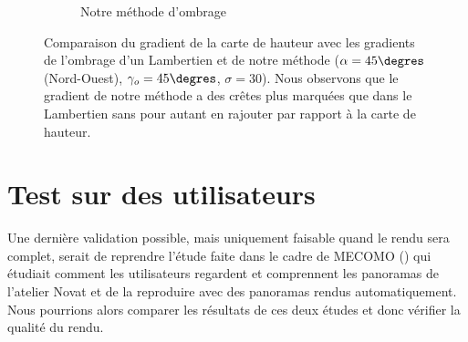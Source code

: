 \begin{figure}[h!]
\begin{subfigure}[t]{0.32\linewidth}
  \caption{Notre méthode d'ombrage}
 \end{subfigure}
 \caption{\label{fig:comparaisonGradient} Comparaison du gradient de la carte de hauteur avec les gradients de l'ombrage d'un Lambertien et de notre méthode ($\alpha = 45\degres$ (Nord-Ouest), $\gamma_o = 45\degres$, $\sigma = 30$). Nous observons que le gradient de notre méthode a des crêtes plus marquées que dans le Lambertien sans pour autant en rajouter par rapport à la carte de hauteur.}
\end{figure}

\section{Test sur des utilisateurs}

Une dernière validation possible, mais uniquement faisable quand le rendu sera complet, serait de reprendre l’étude faite dans le cadre de MECOMO (\cite{balzarini2016effectiveness}) qui étudiait comment les utilisateurs regardent et comprennent les panoramas de l'atelier Novat et de la reproduire avec des panoramas rendus automatiquement. Nous pourrions alors comparer les résultats de ces deux études et donc vérifier la qualité du rendu. 

